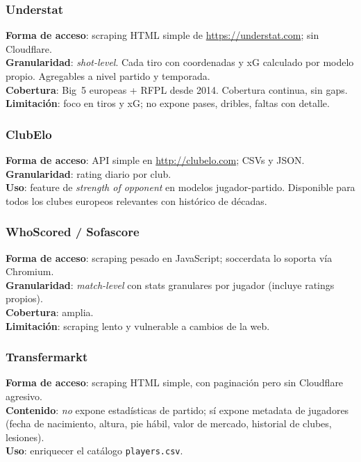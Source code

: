 \subsubsection{Understat}

\textbf{Forma de acceso}: scraping HTML simple de \url{https://understat.com}; sin Cloudflare.\\
\textbf{Granularidad}: \emph{shot-level}. Cada tiro con coordenadas y xG calculado por modelo propio. Agregables a nivel partido y temporada.\\
\textbf{Cobertura}: Big~5 europeas + RFPL desde 2014. Cobertura continua, sin gaps.\\
\textbf{Limitación}: foco en tiros y xG; no expone pases, dribles, faltas con detalle.

\subsubsection{ClubElo}

\textbf{Forma de acceso}: API simple en \url{http://clubelo.com}; CSVs y JSON.\\
\textbf{Granularidad}: rating diario por club.\\
\textbf{Uso}: feature de \emph{strength of opponent} en modelos jugador-partido. Disponible para todos los clubes europeos relevantes con histórico de décadas.

\subsubsection{WhoScored / Sofascore}

\textbf{Forma de acceso}: scraping pesado en JavaScript; soccerdata lo soporta vía Chromium.\\
\textbf{Granularidad}: \emph{match-level} con stats granulares por jugador (incluye ratings propios).\\
\textbf{Cobertura}: amplia.\\
\textbf{Limitación}: scraping lento y vulnerable a cambios de la web.

\subsubsection{Transfermarkt}

\textbf{Forma de acceso}: scraping HTML simple, con paginación pero sin Cloudflare agresivo.\\
\textbf{Contenido}: \emph{no} expone estadísticas de partido; sí expone metadata de jugadores (fecha de nacimiento, altura, pie hábil, valor de mercado, historial de clubes, lesiones).\\
\textbf{Uso}: enriquecer el catálogo \texttt{players.csv}.

